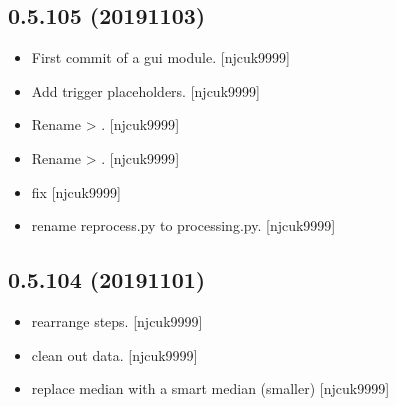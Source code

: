 \documentclass[a4paper,10pt,english]{report}
\begin{document}
\subsection{0.5.105 (2019\sphinxhyphen{}11\sphinxhyphen{}03)}
\label{\detokenize{misc/changelog:id57}}\begin{itemize}
\item {} 
First commit of a gui module. {[}njcuk9999{]}

\item {} 
Add trigger place\sphinxhyphen{}holders. {[}njcuk9999{]}

\item {} 
Rename  \textendash{}\textgreater{} . {[}njcuk9999{]}

\item {} 
Rename  \textendash{}\textgreater{} . {[}njcuk9999{]}

\item {} 
 \sphinxhyphen{} fix  {[}njcuk9999{]}

\item {} 
 \sphinxhyphen{} rename reprocess.py
to processing.py. {[}njcuk9999{]}

\end{itemize}


\subsection{0.5.104 (2019\sphinxhyphen{}11\sphinxhyphen{}01)}
\label{\detokenize{misc/changelog:id58}}\begin{itemize}
\item {} 
 \sphinxhyphen{} rearrange steps. {[}njcuk9999{]}

\item {} 
 \sphinxhyphen{} clean out data. {[}njcuk9999{]}

\item {} 
 \sphinxhyphen{} replace median with a smart median (smaller)
{[}njcuk9999{]}

\end{itemize}
\end{document}
